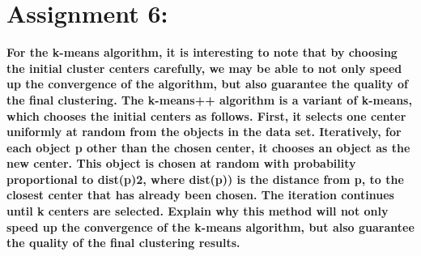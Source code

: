 \documentclass[]{article}
\begin{document}
\section*{Assignment 6:}
\textbf{
For the k-means algorithm, it is interesting to note that by choosing the initial cluster centers 
carefully, we may be able to not only speed up the convergence of the algorithm, but also 
guarantee the quality of the final clustering. The k-means++ algorithm is a variant of k-means, 
which chooses the initial centers as follows. First, it selects one center uniformly at random from 
the objects in the data set. Iteratively, for each object p other than the chosen center, it chooses 
an object as the new center. This object is chosen at random with probability proportional to 
dist(p)2, where dist(p)) is the distance from p, to the closest center that has already been chosen. 
The iteration continues until k centers are selected.
Explain why this method will not only speed up the convergence of the k-means algorithm, but 
also guarantee the quality of the final clustering results.
}
\end{document}
